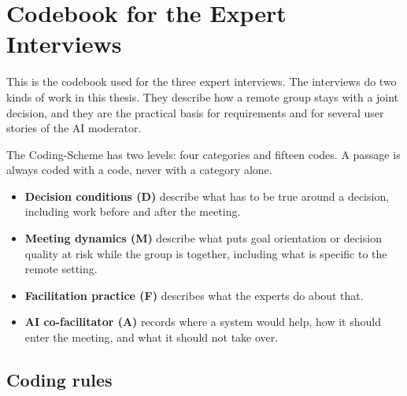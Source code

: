 \section{Codebook for the Expert Interviews}
\label{annex:expert-interview-codebook}

This is the codebook used for the three expert interviews. The interviews do two kinds of work in this thesis.
They describe how a remote group stays with a joint decision, and they are the practical basis
for requirements and for several user stories of the AI moderator.

The Coding-Scheme has two levels: four categories and fifteen codes.
A passage is always coded with a code, never with a category alone.

\begin{itemize}
  \item \textbf{Decision conditions (D)} describe what has to be true around a decision, including
    work before and after the meeting.
  \item \textbf{Meeting dynamics (M)} describe what puts goal orientation or decision quality at
    risk while the group is together, including what is specific to the remote setting.
  \item \textbf{Facilitation practice (F)} describes what the experts do about that.
  \item \textbf{AI co-facilitator (A)} records where a system would help, how it should enter the
    meeting, and what it should not take over.
\end{itemize}

\subsection*{Coding rules}

